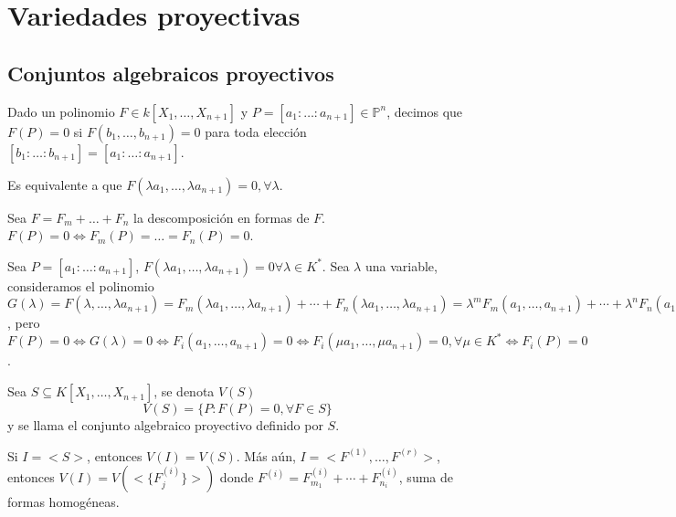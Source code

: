 \chapter{Variedades proyectivas}

\section{Conjuntos algebraicos proyectivos}

\begin{Def}
Dado un polinomio $F\in k[X_1,\dots,X_{n+1}]$ y $P=[a_1:\dots :a_{n+1}]\in \mathbb{P}^n$, decimos que $F(P)=0$ si $F(b_1,\dots,b_{n+1})=0$ para toda elección $[b_1:\dots :b_{n+1}]=[a_1:\dots : a_{n+1}]$. 
\end{Def} 

\begin{nota}
Es equivalente a que $F(\lambda a_1,\dots,\lambda a_{n+1})=0, \forall \lambda$. 
\end{nota}

\begin{nota}
Sea $F=F_m+\dots + F_n$ la descomposición en formas de $F$. $F(P)=0 \Leftrightarrow F_m(P)=\dots =F_n(P)=0$.

\begin{Dem}
Sea $P=[a_1:\dots :a_{n+1}]$, $F(\lambda a_1,\dots ,\lambda a_{n+1})=0 \forall  \lambda \in K^*$. Sea $\lambda $ una variable, consideramos el polinomio $G(\lambda) = F(\lambda, \dots, \lambda a_{n+1})= F_m(\lambda a_1, \dots , \lambda a_{n+1}) + \cdots + F_n (\lambda a_1,\dots , \lambda a_{n+1}) = \lambda^m F_m(a_1,\dots , a_{n+1})+\cdots + \lambda^n F_n(a_1,\dots, a_{n+1})$, pero $F(P)=0 \Leftrightarrow G(\lambda) = 0 \Leftrightarrow F_i(a_1,\dots, a_{n+1})=0 \Leftrightarrow F_i(\mu a_1,\dots , \mu a_{n+1})=0, \forall \mu \in K^* \Leftrightarrow F_i(P)=0$. 
\end{Dem}
\end{nota}

\begin{Def}
Sea $S \subseteq K[X_1,\dots,X_{n+1}]$, se denota $V(S)$ 
$$V(S)=\{ P : F(P)=0, \forall F \in S  \} $$
y se llama el conjunto algebraico proyectivo definido por $S$. 
\end{Def}

\begin{Prop}
Si $I=<S>$, entonces $V(I)=V(S)$. Más aún, $I=<F^{(1)},\dots, F^{(r)}>$, entonces $V(I)=V(<\{ F^{(i)}_j\} >)$ donde $F^{(i)}=F_{m_1}^{(i)}+\cdots +F_{n_i}^{(i)}$, suma de formas homogéneas. 
\end{Prop}

